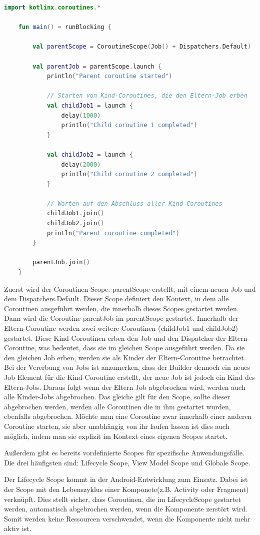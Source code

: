 \documentclass[fontsize=12pt,paper=a4,twoside=semi,parskip=half-,headsepline,headinclude]{scrreprt}
\begin{document}
\begin{lstlisting}[language=Kotlin]
	import kotlinx.coroutines.*

	fun main() = runBlocking {
	
    	val parentScope = CoroutineScope(Job() + Dispatchers.Default)

		val parentJob = parentScope.launch {
			println("Parent coroutine started")
			
			// Starten von Kind-Coroutines, die den Eltern-Job erben
			val childJob1 = launch {
				delay(1000)
				println("Child coroutine 1 completed")
			}
		
			val childJob2 = launch {
				delay(2000)
				println("Child coroutine 2 completed")
			}
		
			// Warten auf den Abschluss aller Kind-Coroutines
			childJob1.join()
			childJob2.join()
			println("Parent coroutine completed")
		}
	
		parentJob.join()
	}
\end{lstlisting}

Zuerst wird der Coroutinen Scope: parentScope erstellt, mit einem neuen Job und dem Dispatchers.Default. Dieser Scope definiert den Kontext, in dem alle Coroutinen ausgeführt werden, die innerhalb dieses Scopes gestartet werden. Dann wird die Coroutine parentJob im parentScope gestartet. Innerhalb der Eltern-Coroutine werden zwei weitere Coroutinen (childJob1 und childJob2) gestartet. Diese Kind-Coroutinen erben den Job und den Dispatcher der Eltern-Coroutine, was bedeutet, dass sie im gleichen Scope ausgeführt werden. Da sie den gleichen Job erben, werden sie als Kinder der Eltern-Coroutine betrachtet. Bei der Vererbung von Jobs ist anzumerken, dass der Builder dennoch ein neues Job Element für die Kind-Coroutine erstellt, der neue Job ist jedoch ein Kind des Eltern-Jobs. Daraus folgt wenn der Eltern Job abgebrochen wird, werden auch alle Kinder-Jobs abgebrochen. Das gleiche gilt für den Scope, sollte dieser abgebrochen werden, werden alle Coroutinen die in ihm gestartet wurden, ebenfalls abgebrochen. Möchte man eine Coroutine zwar innerhalb einer anderen Coroutine starten, sie aber unabhängig von ihr laufen lassen ist dies auch möglich, indem man sie explizit im Kontext eines eigenen Scopes startet.

Außerdem gibt es bereits vordefinierte Scopes für spezifische Anwendungsfälle. Die drei häufigsten sind: Lifecycle Scope, View Model Scope und Globale Scope.

Der Lifecycle Scope kommt in der Android-Entwicklung zum Einsatz. Dabei ist der Scope mit den Lebenszyklus einer Komponete(z.B. Activity oder Fragment) verknüpft. Dies stellt sicher, dass Coroutinen, die im LifecycleScope gestartet werden, automatisch abgebrochen werden, wenn die Komponente zerstört wird. Somit werden keine Ressourcen verschwendet, wenn die Komponente nicht mehr aktiv ist.
\end{document}
